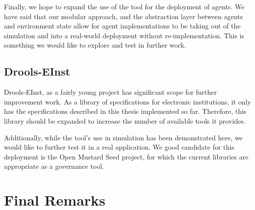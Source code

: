 Finally, we hope to expand the use of the tool for the deployment of agents.
We have said that our modular approach, and the abstraction layer between
agents and environment state allow for agent implementations to be taking out
of the simulation and into a real-world deployment without re-implementation.
This is something we would like to explore and test in further work.

\subsection{Drools-EInst}

Drools-EInst, as a fairly young project has significant scope for further
improvement work. As a library of specifications for electronic institutions,
it only has the specifications described in this thesis implemented so far.
Therefore, this library should be expanded to increase the number of available
tools it provides.

Additionally, while the tool's use in simulation has been demonstrated here,
we would like to further test it in a real application. We good candidate for
this deployment is the Open Mustard Seed project, for which the current
libraries are appropriate as a governance tool.

\section{Final Remarks}
